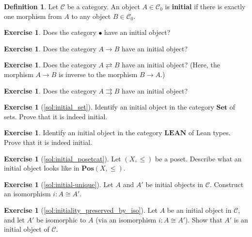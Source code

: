 \documentclass[a4paper,10pt]{scrartcl}
\theoremstyle{plain}
\theoremstyle{definition}
\newtheorem{dfn}[thm]{Definition}
\newtheorem{exer}[thm]{Exercise}
\newcommand{\Cat}[1]{\mathcal{#1}}
\newcommand{\CC}{\Cat{C}}
\newcommand{\Catb}[1]{\mathbf{#1}}
\newcommand{\SET}{\Catb{Set}}
\newcommand{\POS}{\Catb{Pos}}
\newcommand{\LEAN}{\Catb{LEAN}}
\newcommand{\Ob}[1]{{#1}_0}
\begin{document}
\begin{dfn}
  Let $\CC$ be a category. An object $A \in \Ob{\CC}$ is \textbf{initial} if there is exactly one morphism from $A$ to any object $B \in \Ob{\CC}$.
\end{dfn}

\begin{exer}
  Does the category $\bullet$ have an initial object?
\end{exer}

\begin{exer}
  Does the category $A \to B$ have an initial object?
\end{exer}

\begin{exer}
  Does the category $A \rightleftarrows B$ have an initial object? (Here, the morphism $A \to B$ is inverse to the morphism $B \to A$.)
\end{exer}

\begin{exer}
  Does the category $A \rightrightarrows B$ have an initial object?
\end{exer}

\begin{exer}[\cref{sol:initial_set}]\label{exer:initial_set}
  Identify an initial object in the category $\SET$ of sets.
  Prove that it is indeed initial.
\end{exer}

\begin{exer}
  Identify an initial object in the category $\LEAN$ of Lean types.
  Prove that it is indeed initial.
\end{exer}

\begin{exer}[\cref{sol:initial_posetcat}]\label{exer:initial_posetcat}
  Let $(X,\leq)$ be a poset. Describe what an initial object looks like in  $\POS(X,\leq)$.
\end{exer}

\begin{exer}[\cref{sol:initial-unique}]\label{exer:initial-unique}
  Let $A$ and $A'$ be initial objects in $\CC$. Construct an isomorphism $i : A \cong A'$.
\end{exer}

\begin{exer}[\cref{sol:initiality_preserved_by_iso}]\label{exer:initiality_preserved_by_iso}
  Let $A$ be an initial object in $\CC$, and let $A'$ be isomorphic to $A$ (via an isomorphism $i : A \cong A'$).
  Show that $A'$ is an initial object of $\CC$.
\end{exer}
\end{document}
